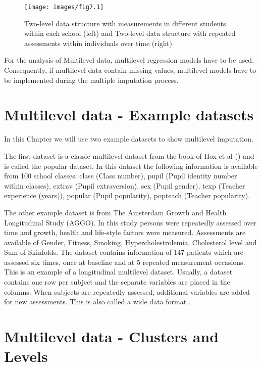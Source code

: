 \documentclass[
]{book}
\begin{document}
\begin{figure}

{\centering \texttt{[image: images/fig7.1]} 

}

\caption{Two-level data structure with measurements in different students within each school (left) and Two-level data structure with repeated assessments within individuals over time (right)}\label{fig:fig71}
\end{figure}

For the analysis of Multilevel data, multilevel regression models have to be used. Consequently, if multilevel data contain missing values, multilevel models have to be implemented during the multiple imputation process.

\hypertarget{multilevel-data---example-datasets}{%
\section{Multilevel data - Example datasets}\label{multilevel-data---example-datasets}}

In this Chapter we will use two example datasets to show multilevel imputation.

The first dataset is a classic multilevel dataset from the book of Hox et al (\citet{hox2018multilevelanalysis}) and is called the popular dataset. In this dataset the following information is available from 100 school classes: class (Class number), pupil (Pupil identity number within classes), extrav (Pupil extraversion), sex (Pupil gender), texp (Teacher experience (years)), popular (Pupil popularity), popteach (Teacher popularity).

The other example dataset is from The Amsterdam Growth and Health Longitudinal Study (AGGO). In this study persons were repeatedly assessed over time and growth, health and life-style factors were measured. Assessments are available of Gender, Fitness, Smoking, Hypercholestrolemia, Cholesterol level and Sum of Skinfolds. The dataset contains information of 147 patients which are assessed six times, once at baseline and at 5 repeated measurement occasions. This is an example of a longitudinal multilevel dataset. Usually, a dataset contains one row per subject and the separate variables are placed in the columns. When subjects are repeatedly assessed, additional variables are added for new assessments. This is also called a wide data format .

\hypertarget{multilevel-data---clusters-and-levels}{%
\section{Multilevel data - Clusters and Levels}\label{multilevel-data---clusters-and-levels}}
\end{document}
